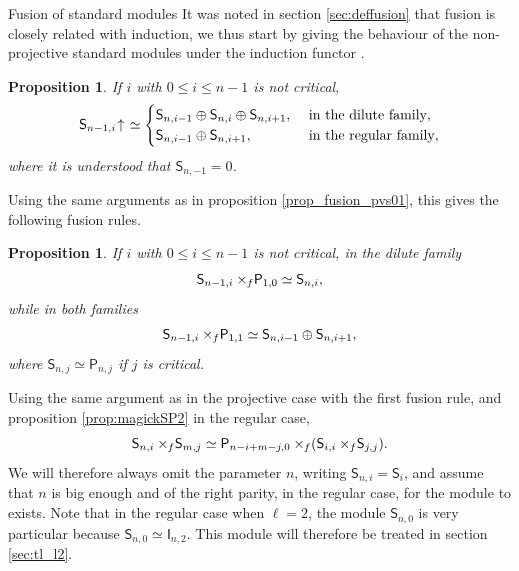 \documentclass[reqno]{amsart}
\newtheorem{Prop}[Thm]{Proposition}
\newcommand{\ds}[1]{\mathsf S_{#1}}
\newcommand{\dl}[1]{\mathsf I_{#1}}
\newcommand{\dP}[1]{\mathsf P_{#1}}
\newcommand{\kc}{k_c}
\newcommand{\xf}{\times\hspace{-0.27em}_f}
\newcommand{\lc}{\ell}
\newcommand{\Ind}[1]{#1{}\hspace{-0.18em} \uparrow{}\hskip -0.18em}
\begin{document}
\begin{section}{Fusion of standard modules}\label{sec:fusion.standard}
It was noted in section \ref{sec:deffusion} that fusion is closely related with induction, we thus start by giving the behaviour of the non-projective standard modules under the induction functor \cite{RiSY,BelSY,BelRiSy}.
\begin{Prop}
If $i$ with $0\leq i \leq n-1$ is not critical, \begin{equation}
\Ind{\ds{n-1,i}} \simeq \begin{cases}
\ds{n,i-1} \oplus \ds{n,i} \oplus \ds{n,i+1}, & \text{ in the dilute family},\\
\ds{n,i-1} \oplus \ds{n,i+1}, & \text{ in the regular family},
\end{cases}
\end{equation} 
where it is understood that $\ds{n,-1} = 0$.
\end{Prop}
Using the same arguments as in proposition \ref{prop_fusion_pvs01}, this gives the following fusion rules.
\begin{Prop}\label{prop_fusion_svs01}
If $i$ with $0\leq i \leq n-1$ is not critical, in the dilute family
\begin{equation}
\ds{n-1,i}\xf \dP{1,0} \simeq \ds{n,i} \text{,}
\end{equation}
while in both families
\begin{equation}\label{eq:fusion_svs1}
\ds{n-1,i}\xf \dP{1,1} \simeq \ds{n,i-1} \oplus \ds{n,i+1}\text{,}
\end{equation}
where $\ds{n,j}\simeq\dP{n,j}$ if $j$ is critical.
\end{Prop}
Using the same argument as in the projective case with the first fusion rule, and proposition \ref{prop:magickSP2} in the regular case, $$\ds{n,i} \xf \ds{m,j} \simeq \dP{n-i + m-j,0} \xf(\ds{i,i} \xf \ds{j,j}) \text{.}$$ We will therefore always omit the parameter $n$, writing $\ds{n,i} = \ds{i}$, and assume that $n$ is big enough and of the right parity, in the regular case, for the module to exists. Note that in the regular case when $\lc =2$, the module $\ds{n,0}$ is very particular because $\ds{n,0} \simeq \dl{n,2}$. This module will therefore be treated in section \ref{sec:tl_l2}.


\end{section}
\end{document}
